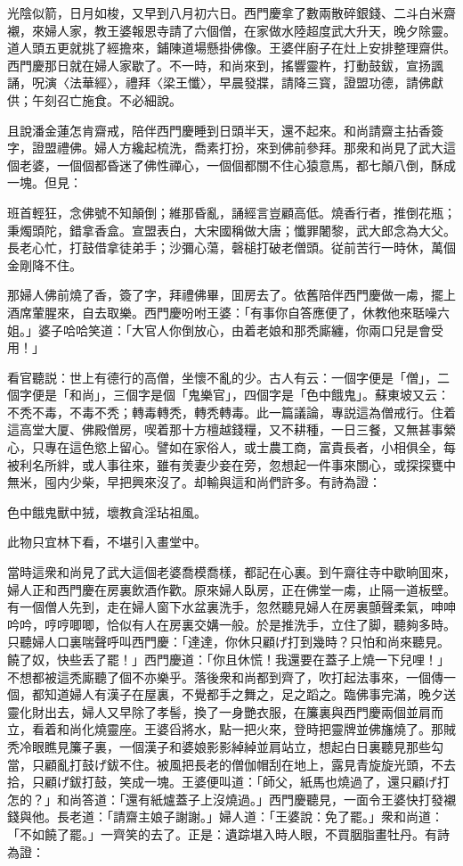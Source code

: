 光陰似箭，日月如梭，又早到八月初六日。西門慶拿了數兩散碎銀錢、二斗白米齋襯，來婦人家，教王婆報恩寺請了六個僧，在家做水陸超度武大升天，晚夕除靈。道人頭五更就挑了經擔來，鋪陳道場懸掛佛像。王婆伴廚子在灶上安排整理齋供。西門慶那日就在婦人家歇了。不一時，和尚來到，搖響靈杵，打動鼓鈸，宣扬諷誦，呪演〈法華經〉，禮拜〈梁王懺〉，早晨發牃，請降三寳，證盟功德，請佛獻供；午刻召亡施食。不必細說。

且說潘金蓮怎肯齋戒，陪伴西門慶睡到日頭半天，還不起來。和尚請齋主拈香簽字，證盟禮佛。婦人方纔起梳洗，喬素打扮，來到佛前參拜。那衆和尚見了武大這個老婆，一個個都昏迷了佛性禪心，一個個都關不住心猿意馬，都七顛八倒，酥成一塊。但見：

班首輕狂，念佛號不知顛倒；維那昏亂，誦經言豈顧高低。燒香行者，推倒花瓶；秉燭頭陀，錯拿香盒。宣盟表白，大宋國稱做大唐；懺罪闍黎，武大郎念為大父。長老心忙，打鼓借拿徒弟手；沙彌心蕩，磬槌打破老僧頭。従前苦行一時休，萬個金剛降不住。

那婦人佛前燒了香，簽了字，拜禮佛畢，囬房去了。依舊陪伴西門慶做一䖏，擺上酒席葷腥來，自去取樂。西門慶吩咐王婆：「有事你自答應便了，休教他來聒噪六姐。」婆子哈哈笑道：「大官人你倒放心，由着老娘和那秃廝纏，你兩口兒是會受用！」

看官聽説：世上有德行的高僧，坐懷不亂的少。古人有云：一個字便是「僧」，二個字便是「和尚」，三個字是個「鬼樂官」，四個字是「色中餓鬼」。蘇東坡又云：不秃不毒，不毒不秃；轉毒轉秃，轉秃轉毒。此一篇議論，專説這為僧戒行。住着這高堂大厦、佛殿僧房，喫着那十方檀越錢糧，又不耕種，一日三餐，又無甚事縈心，只專在這色慾上留心。譬如在家俗人，或士農工商，富貴長者，小相俱全，每被利名所絆，或人事往來，雖有羙妻少妾在旁，忽想起一件事來關心，或探探甕中無米，囤内少柴，早把興來沒了。却輸與這和尚們許多。有詩為證：

色中餓鬼獸中狨，壞教貪淫玷祖風。

此物只宜林下看，不堪引入畫堂中。

當時這衆和尚見了武大這個老婆喬模喬樣，都記在心裏。到午齋往寺中歇晌囬來，婦人正和西門慶在房裏飲酒作歡。原來婦人臥房，正在佛堂一䖏，止隔一道板壁。有一個僧人先到，走在婦人窗下水盆裏洗手，忽然聽見婦人在房裏顫聲柔氣，呻呻吟吟，哼哼唧唧，恰似有人在房裏交媾一般。於是推洗手，立住了脚，聽夠多時。只聽婦人口裏喘聲呼叫西門慶：「達達，你休只顧げ打到幾時？只怕和尚來聽見。饒了奴，快些丢了罷！」西門慶道：「你且休慌！我還要在蓋子上燒一下兒哩！」不想都被這秃廝聽了個不亦樂乎。落後衆和尚都到齊了，吹打起法事來，一個傳一個，都知道婦人有漢子在屋裏，不覺都手之舞之，足之蹈之。臨佛事完滿，晚夕送靈化財出去，婦人又早除了孝髻，換了一身艷衣服，在簾裏與西門慶兩個並肩而立，看着和尚化燒靈座。王婆舀將水，點一把火來，登時把靈牌並佛旛燒了。那賊秃冷眼瞧見簾子裏，一個漢子和婆娘影影綽綽並肩站立，想起白日裏聽見那些勾當，只顧亂打鼓げ鈸不住。被風把長老的僧伽帽刮在地上，露見青旋旋光頭，不去拾，只顧げ鈸打鼓，笑成一塊。王婆便叫道：「師父，紙馬也燒過了，還只顧げ打怎的？」和尚答道：「還有紙爐蓋子上沒燒過。」西門慶聽見，一面令王婆快打發襯錢與他。長老道：「請齋主娘子謝謝。」婦人道：「王婆說：免了罷。」衆和尚道：「不如饒了罷。」一齊笑的去了。正是：遺踪堪入時人眼，不買胭脂畫牡丹。有詩為證：


